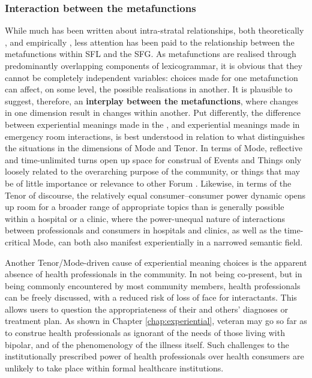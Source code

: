 \subsubsection{Interaction between the metafunctions}

While much has been written about intra\hyp{}stratal relationships, both theoretically \cite[e.g.][]{hasan_structure_1985}, and empirically \cite[e.g.][]{clarke_patterns_2012}, less attention has been paid to the relationship between the metafunctions within \gls{SFL} and the \gls{SFG}. As metafunctions are realised through predominantly overlapping components of lexicogrammar, it is obvious that they cannot be completely independent variables: choices made for one metafunction can affect, on some level, the possible realisations in another. It is plausible to suggest, therefore, an \textbf{interplay between the metafunctions}, where changes in one dimension result in changes within another. Put differently, the difference between experiential meanings made in the , and experiential meanings made in emergency room interactions, is best understood in relation to what distinguishes the situations in the dimensions of \gls{Mode} and Tenor. In terms of \gls{Mode}, reflective and time\hyp{}unlimited turns open up space for construal of Events and Things only loosely related to the overarching purpose of the community, or things that may be of little importance or relevance to other \gls{Forum} . Likewise, in terms of the Tenor of discourse, the relatively equal consumer--consumer power dynamic opens up room for a broader range of appropriate topics than is generally possible within a hospital or a clinic, where the power\hyp{}unequal nature of interactions between professionals and consumers in hospitals and clinics, as well as the time\hyp{}critical \gls{Mode}, can both also manifest experientially in a narrowed semantic field.

Another Tenor\slash \gls{Mode}\hyp{}driven cause of experiential meaning choices is the apparent absence of health professionals in the community. In not being co\hyp{}present, but in being commonly encountered by most community members, health professionals can be freely discussed, with a reduced risk of loss of face for interactants. This allows users to question the appropriateness of their and others' diagnoses or treatment plan. As shown in Chapter \ref{chap:experiential}, veteran  may go so far as to construe health professionals as ignorant of the needs of those living with \gls{bipolar}, and of the phenomenology of the illness itself. Such challenges to the institutionally prescribed power of health professionals over health consumers are unlikely to take place within formal healthcare institutions.

